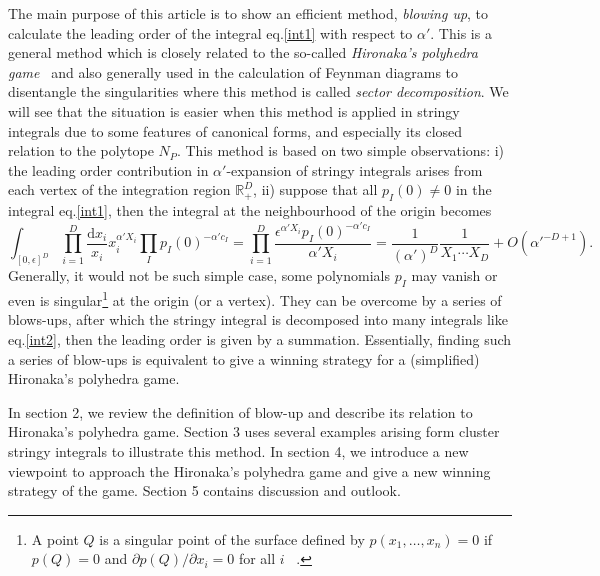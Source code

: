 \documentclass[12pt]{article}
\theoremstyle{definition}
\theoremstyle{plain}
\newcommand{\dif}{\mathrm{d}} %
\begin{document}
The main purpose of this article is to show an efficient method, {\it{blowing up}}, %
to calculate the leading order of the integral eq.\eqref{int1} with respect to $\alpha'$. This is a general method which is closely related to the so-called \emph{Hironaka's polyhedra game}~\cite{hironaka1967} and also generally used in the calculation of Feynman diagrams to disentangle the singularities where this method is called {\emph{sector decomposition}}\cite{}. We will see that the situation is easier when this method is applied in stringy integrals due to some features of canonical forms, and especially its closed relation to the polytope $N_{P}$. This method is based on two simple observations: i) the leading order contribution in $\alpha'$-expansion of stringy integrals arises from each vertex of the integration region $\mathbb{R}_{+}^{D}$, ii) suppose that all $p_I(0)\neq 0$ in the integral eq.\eqref{int1}, then the integral at the neighbourhood of the origin becomes 
\begin{equation}\label{int2}
	\int_{[0,\epsilon]^D}\prod_{i=1}^D\frac{\dif x_i}{x_i}x_i^{\alpha' X_i} \prod_{I}p_{I}(0)^{-\alpha' c_{I}}
	=\prod_{i=1}^D\frac{\epsilon^{\alpha' X_i}p_{I}(0)^{-\alpha' c_{I}}}{\alpha' X_i}
	= \frac{1}{(\alpha')^D}\frac{1}{X_1\cdots X_D}+O(\alpha'^{-D+1}).
\end{equation}
Generally, it would not be such simple case, some polynomials $p_{I}$ may vanish or even is singular\footnote{A point $Q$ is a singular point of the surface defined by $p(x_{1},\dots,x_{n})=0$ if $p(Q)=0$ and $\partial p(Q)/\partial x_{i} =0$ for all $i$~%
\cite{shafarevich1994basic}. } at the origin (or a vertex).
They can be overcome by a series of blows-ups, after which the stringy integral is decomposed into many integrals like eq.\eqref{int2}, then the leading order is given by a summation. %
Essentially, finding such a series of blow-ups is equivalent to give a winning strategy for a (simplified) Hironaka's polyhedra game.


In section 2, we review the definition of blow-up and describe its relation to Hironaka's polyhedra game.
Section 3 uses several examples arising form cluster stringy integrals to illustrate this method.
In section 4, we introduce a new viewpoint to approach the Hironaka's polyhedra game and give a new winning strategy of the game.
Section 5 contains discussion and outlook. 
\end{document}
